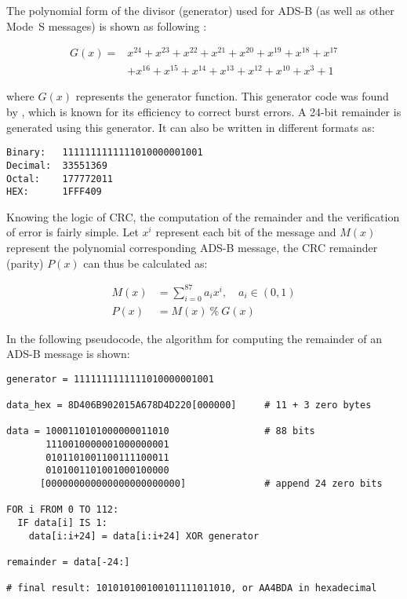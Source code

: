 The polynomial form of the divisor (generator) used for ADS-B (as well as other Mode~S messages) is shown as following \cite{gertz1984}:

\begin{equation}
  \begin{split}
  G(x) = &x^{24}+x^{23}+x^{22}+x^{21}+x^{20}+x^{19}+x^{18}+x^{17} \\
         &+x^{16}+x^{15}+x^{14}+x^{13}+x^{12}+x^{10}+x^{3}+1
  \end{split}
\end{equation}

where $G(x)$ represents the generator function. This generator code was found by \cite{kasami1964}, which is known for its efficiency to correct burst errors. A 24-bit remainder is generated using this generator. It can also be written in different formats as:

\begin{verbatim}
Binary:   1111111111111010000001001
Decimal:  33551369
Octal:    177772011
HEX:      1FFF409
\end{verbatim}

Knowing the logic of CRC, the computation of the remainder and the verification of error is fairly simple. Let  $x^{i}$ represent each bit of the message and $M(x)$ represent the polynomial corresponding ADS-B message, the CRC remainder (parity) $P(x)$ can thus be calculated as:

\begin{equation}
  \begin{split}
    M(x) &= \sum_{i=0}^{87} a_i x^i , \quad a_i \in (0, 1)\\
    P(x) &= M(x) ~ \% ~ G(x)
  \end{split}
\end{equation}

In the following pseudocode, the algorithm for computing the remainder of an ADS-B message is shown:

\begin{verbatim}
generator = 1111111111111010000001001

data_hex = 8D406B902015A678D4D220[000000]     # 11 + 3 zero bytes

data = 1000110101000000011010                 # 88 bits
       1110010000001000000001
       0101101001100111100011
       0101001101001000100000
      [000000000000000000000000]              # append 24 zero bits

FOR i FROM 0 TO 112:
  IF data[i] IS 1:
    data[i:i+24] = data[i:i+24] XOR generator

remainder = data[-24:]

# final result: 101010100100101111011010, or AA4BDA in hexadecimal
\end{verbatim}

